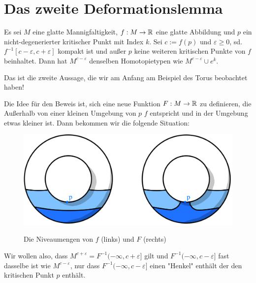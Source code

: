\section{Das zweite Deformationslemma}

\begin{theorem}
    \label{theorem:zweites deformationslemma}
    Es sei $M$ eine glatte Mannigfaltigkeit, $f: M \rightarrow { \mathbb R }$ eine glatte
    Abbildung und $p$ ein nicht-degenerierter kritischer Punkt mit Index 
    $k$. Sei $c := f(p)$ und $\varepsilon \geq 0$, sd. 
    $f^{-1}[c - \varepsilon, c + \varepsilon]$ kompakt ist und außer $p$ keine 
    weiteren kritischen Punkte von $f$ beinhaltet. Dann hat $M^{c-\varepsilon}$
    denselben Homotopietypen wie $M^{c - \varepsilon} \cup e^k$.
\end{theorem}

Das ist die zweite Aussage, die wir am Anfang am Beispiel des Torus beobachtet haben!

Die Idee für den Beweis ist, sich eine neue Funktion $F: M \to { \mathbb R }$ zu definieren,
die Außerhalb von einer kleinen Umgebung von $p$ $f$ entspricht und in der 
Umgebung etwas kleiner ist. Dann bekommen wir die folgende Situation:

\begin{figure}[H]
    \centering
    \includegraphics[width=0.8\linewidth]{resources/Me-Diagram5-sublevelsets-of-f-and-F.jpeg}
    \label{fig:me-diagram5}
    \caption{Die Niveaumengen von $f$ (links) und $F$ (rechts)}
\end{figure}

Wir wollen also, dass $M^{c + \varepsilon} = F^{-1}(- \infty, c + \varepsilon]$ 
gilt und $F^{-1}(-\infty, c - \varepsilon]$ fast dasselbe ist wie 
$M^{c - \varepsilon}$, nur dass $F^{-1}(-\infty, c - \varepsilon]$ einen "Henkel"
enthält der den kritischen Punkt $p$ enthält.

